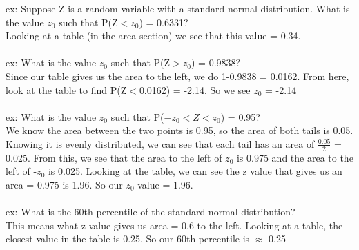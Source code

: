\documentclass[12pt, a4paper]{article}
\begin{document}
	ex: Suppose Z is a random variable with a standard normal distribution. What is the value $z_0$ such that P(Z$<z_0$) = 0.6331? \\ Looking at a table (in the area section) we see that this value = 0.34. \\~\\
	ex: What is the value $z_0$ such that P(Z$>z_0$) = 0.9838? \\
	Since our table gives us the area to the left, we do 1-0.9838 = 0.0162. From here, look at the table to find P(Z$<$0.0162) = -2.14. So we see $z_0$ = -2.14 \\~\\
	ex: What is the value $z_0$ such that P($-z_0 < Z < z_0$) = 0.95? \\
	We know the area between the two points is 0.95, so the area of both tails is 0.05. Knowing it is evenly distributed, we can see that each tail has an area of $\frac{0.05}{2}$ = 0.025. From this, we see that the area to the left of $z_0$ is 0.975 and the area to the left of -$z_0$ is 0.025. Looking at the table, we can see the z value that gives us an area = 0.975 is 1.96. So our $z_0$ value = 1.96. \\~\\
	ex: What is the 60th percentile of the standard normal distribution? \\
	This means what z value gives us area = 0.6 to the left. Looking at a table, the closest value in the table is 0.25. So our 60th percentile is $\approx$ 0.25 \newpage
	
\end{document}
